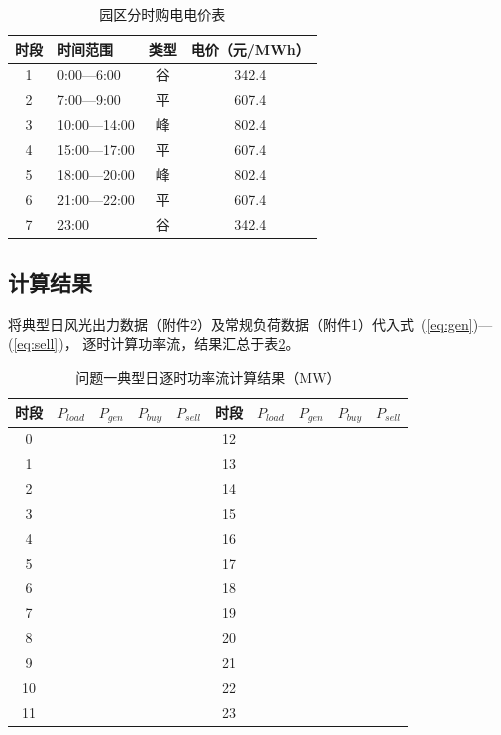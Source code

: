 \documentclass[UTF8,12pt,a4paper]{ctexart}
\newcommand{\blank}[1]{\underline{\makebox[#1][c]{}}}
\newcommand{\RES}{\blank{2cm}}          %
\begin{document}
\begin{table}[htbp]
\centering
\caption{园区分时购电电价表}
\label{tab:price}
\begin{tabular}{clcc}
\toprule
时段 & 时间范围 & 类型 & 电价（元/MWh） \\
\midrule
1  & 0:00—6:00  & 谷 & 342.4 \\
2  & 7:00—9:00  & 平 & 607.4 \\
3  & 10:00—14:00 & 峰 & 802.4 \\
4  & 15:00—17:00 & 平 & 607.4 \\
5  & 18:00—20:00 & 峰 & 802.4 \\
6  & 21:00—22:00 & 平 & 607.4 \\
7  & 23:00      & 谷 & 342.4 \\
\bottomrule
\end{tabular}
\end{table}

\subsection{计算结果}

将典型日风光出力数据（附件2）及常规负荷数据（附件1）代入式~(\ref{eq:gen})—(\ref{eq:sell})，
逐时计算功率流，结果汇总于表\ref{tab:p1_power}。

\begin{table}[htbp]
\centering
\caption{问题一典型日逐时功率流计算结果（MW）}
\label{tab:p1_power}
\small
\setlength{\tabcolsep}{5pt}
\begin{tabular}{ccccc||ccccc}
\toprule
时段 & $P_{load}$ & $P_{gen}$ & $P_{buy}$ & $P_{sell}$ &
时段 & $P_{load}$ & $P_{gen}$ & $P_{buy}$ & $P_{sell}$ \\
\midrule
0  & \RES & \RES & \RES & \RES & 12 & \RES & \RES & \RES & \RES \\
1  & \RES & \RES & \RES & \RES & 13 & \RES & \RES & \RES & \RES \\
2  & \RES & \RES & \RES & \RES & 14 & \RES & \RES & \RES & \RES \\
3  & \RES & \RES & \RES & \RES & 15 & \RES & \RES & \RES & \RES \\
4  & \RES & \RES & \RES & \RES & 16 & \RES & \RES & \RES & \RES \\
5  & \RES & \RES & \RES & \RES & 17 & \RES & \RES & \RES & \RES \\
6  & \RES & \RES & \RES & \RES & 18 & \RES & \RES & \RES & \RES \\
7  & \RES & \RES & \RES & \RES & 19 & \RES & \RES & \RES & \RES \\
8  & \RES & \RES & \RES & \RES & 20 & \RES & \RES & \RES & \RES \\
9  & \RES & \RES & \RES & \RES & 21 & \RES & \RES & \RES & \RES \\
10 & \RES & \RES & \RES & \RES & 22 & \RES & \RES & \RES & \RES \\
11 & \RES & \RES & \RES & \RES & 23 & \RES & \RES & \RES & \RES \\
\bottomrule
\end{tabular}
\end{table}
\end{document}
